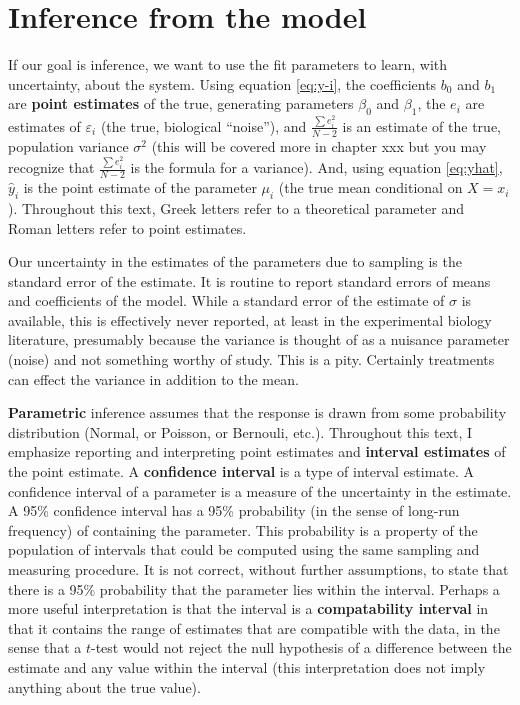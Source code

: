 \documentclass[]{book}
\begin{document}
\hypertarget{inference-from-the-model}{%
\section{Inference from the model}\label{inference-from-the-model}}

If our goal is inference, we want to use the fit parameters to learn, with uncertainty, about the system. Using equation \eqref{eq:y-i}, the coefficients \(b_0\) and \(b_1\) are \textbf{point estimates} of the true, generating parameters \(\beta_0\) and \(\beta_1\), the \(e_i\) are estimates of \(\varepsilon_i\) (the true, biological ``noise''), and \(\frac{\sum{e_i^2}}{N-2}\) is an estimate of the true, population variance \(\sigma^2\) (this will be covered more in chapter xxx but you may recognize that \(\frac{\sum{e_i^2}}{N-2}\) is the formula for a variance). And, using equation \eqref{eq:yhat}, \(\hat{y}_i\) is the point estimate of the parameter \(\mu_i\) (the true mean conditional on \(X=x_i\)). Throughout this text, Greek letters refer to a theoretical parameter and Roman letters refer to point estimates.

Our uncertainty in the estimates of the parameters due to sampling is the standard error of the estimate. It is routine to report standard errors of means and coefficients of the model. While a standard error of the estimate of \(\sigma\) is available, this is effectively never reported, at least in the experimental biology literature, presumably because the variance is thought of as a nuisance parameter (noise) and not something worthy of study. This is a pity. Certainly treatments can effect the variance in addition to the mean.

\textbf{Parametric} inference assumes that the response is drawn from some probability distribution (Normal, or Poisson, or Bernouli, etc.). Throughout this text, I emphasize reporting and interpreting point estimates and \textbf{interval estimates} of the point estimate. A \textbf{confidence interval} is a type of interval estimate. A confidence interval of a parameter is a measure of the uncertainty in the estimate. A 95\% confidence interval has a 95\% probability (in the sense of long-run frequency) of containing the parameter. This probability is a property of the population of intervals that could be computed using the same sampling and measuring procedure. It is not correct, without further assumptions, to state that there is a 95\% probability that the parameter lies within the interval. Perhaps a more useful interpretation is that the interval is a \textbf{compatability interval} in that it contains the range of estimates that are compatible with the data, in the sense that a \(t\)-test would not reject the null hypothesis of a difference between the estimate and any value within the interval (this interpretation does not imply anything about the true value).
\end{document}
